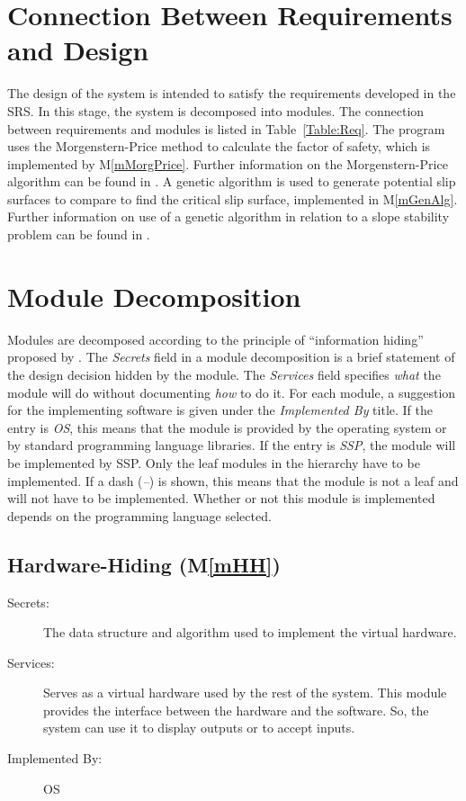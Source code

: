 \documentclass[12pt, titlepage]{article}
\newcommand{\progname}{SSP}
\newcommand{\mref}[1]{M\ref{#1}}
\begin{document}
\section{Connection Between Requirements and Design} \label{SecConnection}

\hspace{3ex}The design of the system is intended to satisfy the
requirements developed in the SRS. In this stage, the system is
decomposed into modules. The connection between requirements and
modules is listed in Table~\ref{Table:Req}. The program uses the 
Morgenstern-Price method to calculate the factor of safety, which is implemented
by \mref{mMorgPrice}. Further information on the Morgenstern-Price algorithm 
can be found in \cite{ZhuEtAl2005}. A genetic algorithm is used to generate 
potential slip surfaces to compare to find the critical slip surface, 
implemented in \mref{mGenAlg}. Further information on use of a genetic 
algorithm in relation to a slope stability problem can be found in 
\cite{LiEtAl}.


\section{Module Decomposition} \label{SecMD}

\hspace{3ex}Modules are decomposed according to the principle of
``information hiding'' proposed by \citet{ParnasEtAl1984}. The
\emph{Secrets} field in a module decomposition is a brief statement of
the design decision hidden by the module. The \emph{Services} field
specifies \emph{what} the module will do without documenting
\emph{how} to do it. For each module, a suggestion for the
implementing software is given under the \emph{Implemented By}
title. If the entry is \emph{OS}, this means that the module is
provided by the operating system or by standard programming language
libraries. If the entry is \emph{\progname}, the module will be implemented by 
\progname. Only the leaf modules in the hierarchy have to be implemented. If a 
dash (\emph{--}) is shown, this means that the module is not a leaf and will 
not have to be implemented. Whether or not this module is implemented depends 
on the programming language selected.

\subsection{Hardware-Hiding (\mref{mHH})}

\begin{description}
\item[Secrets:]The data structure and algorithm used to implement the
  virtual hardware.
\item[Services:]Serves as a virtual hardware used by the rest of the
  system. This module provides the interface between the hardware and
  the software. So, the system can use it to display outputs or to
  accept inputs.
\item[Implemented By:] OS
\end{description}
\end{document}
